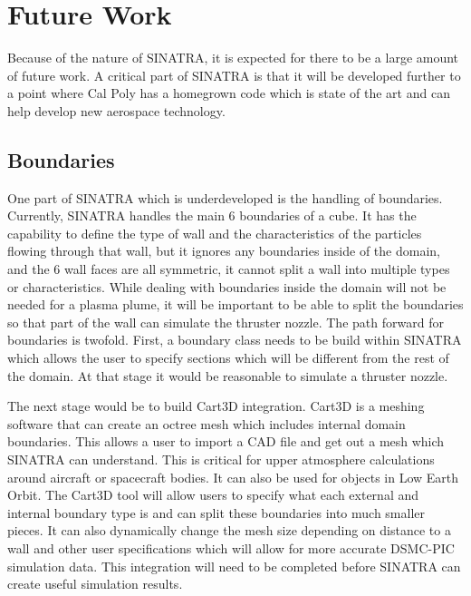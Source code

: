 
\section{Future Work}
\label{sec:future}
Because of the nature of SINATRA, it is expected for there to be a large amount of future work. A critical part of SINATRA is that it will be developed further to a point where Cal Poly has a homegrown code which is state of the art and can help develop new aerospace technology.

\subsection{Boundaries}

One part of SINATRA which is underdeveloped is the handling of boundaries. Currently, SINATRA handles the main 6 boundaries of a cube. It has the capability to define the type of wall and the characteristics of the particles flowing through that wall, but it ignores any boundaries inside of the domain, and the 6 wall faces are all symmetric, it cannot split a wall into multiple types or characteristics. While dealing with boundaries inside the domain will not be needed for a plasma plume, it will be important to be able to split the boundaries so that part of the wall can simulate the thruster nozzle. The path forward for boundaries is twofold. First, a boundary class needs to be build within SINATRA which allows the user to specify sections which will be different from the rest of the domain. At that stage it would be reasonable to simulate a thruster nozzle. \par

\indent The next stage would be to build Cart3D integration. Cart3D is a meshing software that can create an octree mesh which includes internal domain boundaries. This allows a user to import a CAD file and get out a mesh which SINATRA can understand. This is critical for upper atmosphere calculations around aircraft or spacecraft bodies. It can also be used for objects in Low Earth Orbit. The Cart3D tool will allow users to specify what each external and internal boundary type is and can split these boundaries into much smaller pieces. It can also dynamically change the mesh size depending on distance to a wall and other user specifications which will allow for more accurate DSMC-PIC simulation data. This integration will need to be completed before SINATRA can create useful simulation results. \par


